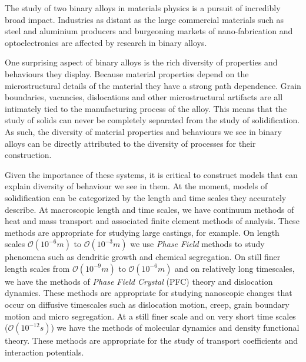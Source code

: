\label{chapter:introduction}



The study of two binary alloys in materials physics is a pursuit of incredibly
broad impact. Industries as distant as the large commercial materials such as
steel and aluminium producers and burgeoning markets of nano-fabrication and
optoelectronics are affected by research in binary alloys.

One surprising aspect of binary alloys is the rich diversity of properties and
behaviours they display. Because material properties depend on the
microstructural details of the material they have a strong path dependence.
Grain boundaries, vacancies, dislocations and other microstructural artifacts
are all intimately tied to the manufacturing process of the alloy. This means
that the study of solids can never be completely separated from the study of
solidification. As such, the diversity of material properties and behaviours we
see in binary alloys can be directly attributed to the diversity of processes
for their construction.

Given the importance of these systems, it is critical to construct models that
can explain diversity of behaviour we see in them. At the moment, models of
solidification can be categorized by the length and time scales they accurately
describe. At macroscopic length and time scales, we have continuum methods of
heat and mass transport and associated finite element methods of analysis. These
methods are appropriate for studying large castings, for example. On length
scales $\mathcal{O}(10^{-6}m)$ to $\mathcal{O}(10^{-3}m)$ we use
\textit{Phase Field} methods to study phenomena such as dendritic growth and
chemical segregation. On still finer length scales from $\mathcal{O}(10^{-9}m)$
to $\mathcal{O}(10^{-6}m)$ and on relatively long timescales, we have the
methods of \textit{Phase Field Crystal} (PFC) theory and dislocation dynamics.
These methods are appropriate for studying nanoscopic changes that occur on
diffusive timescales such as dislocation motion, creep, grain boundary motion
and micro segregation. At a still finer scale and on very short time scales
($\mathcal{O}(10^{-12}s)$) we have the methods of molecular dynamics and density
functional theory. These methods are appropriate for the study of transport
coefficients and interaction potentials.


